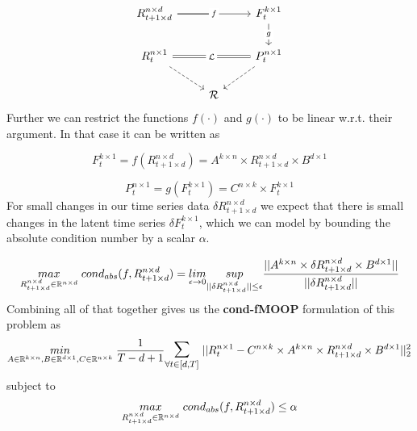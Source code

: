 \begin{equation} \label{pts_diagram}
\begin{tikzcd}
R^{n\times d}_{t+1 \times d} \arrow[rr, "f" description] \arrow[r, no head]& {}& F^{k\times 1}_{t} \arrow[d, "g" description] \\
R^{n\times 1}_t \arrow[rr, "\mathcal{L}" description, Rightarrow, no head] \arrow[rd, dashed] && P^{n \times 1}_{t} \arrow[ld, dashed]\\
& \mathcal{R} &
\end{tikzcd}
\end{equation}\newline 
Further we can restrict the functions $f(\cdot)$ and $g(\cdot)$ to be linear w.r.t. their argument. In that case it can be written as

\begin{equation} \label{f_for_pts}
F^{k\times 1}_t = f(R^{n\times d}_{t+1\times d}) = A^{k\times n}\times R^{n\times d}_{t+1\times d}\times B^{d\times 1}
\end{equation}

\begin{equation} \label{g_for_pts}
P^{n \times 1}_{t} = g(F^{k\times 1}_t) = C^{n \times k} \times F^{k\times 1}_t
\end{equation}
\newline
For small changes in our time series data $\delta R^{n\times d}_{t+1\times d}$ we expect that there is small changes in the latent time series $\delta F^{k\times 1}_t$, which we can model by bounding the absolute condition number by a scalar $\alpha$.

\begin{equation}
    \underset{R^{n\times d}_{t+1\times d} \in \mathbb{R}^{n\times d}}{max}\hspace{1mm} cond_{abs}(f,R^{n\times d}_{t+1\times d}) = \underset{\epsilon \to 0}{lim}\underset{||\delta R^{n\times d}_{t+1\times d}||\le \epsilon}{sup} \frac{||A^{k\times n}\times \delta R^{n\times d}_{t+1\times d}\times B^{d\times 1}||}{||\delta R^{n\times d}_{t+1\times d}||}
\end{equation}\newline
Combining all of that together gives us the \textbf{cond-fMOOP} formulation of this problem as
\begin{equation} \label{pts_loss}
\underset{A\in \mathbb{R}^{k\times n}, B \in \mathbb{R}^{d\times 1}, C \in \mathbb{R}^{n\times k}}{min}\hspace{1mm} \frac{1}{T-d+1} \mathlarger{\mathlarger{\sum}}_{\forall t\in [d,T]} \hspace{1mm} ||R^{n\times 1}_t-C^{n \times k} \times A^{k\times n}\times R^{n\times d}_{t+1\times d}\times B^{d\times 1}||_2^2
\end{equation}\newline
subject to
\begin{equation} \label{lfm_cond}
\underset{R^{n\times d}_{t+1\times d} \in \mathbb{R}^{n\times d}}{max}\hspace{1mm} cond_{abs}(f,R^{n\times d}_{t+1\times d}) \le \alpha
\end{equation}
\newline

